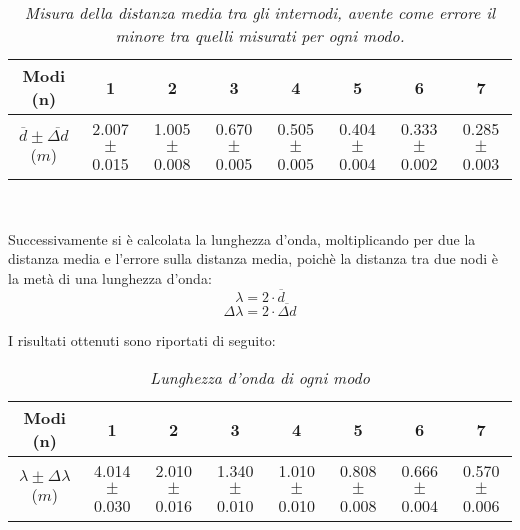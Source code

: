 \documentclass[12pt, a4paper]{article}
\begin{document}
{
\renewcommand\arraystretch{1.2} %

\begin{table}[ht] %


\begin{tabular}{|c|c|c|c|c|c|c|c|} 
 
 \hline
  \small Modi (n) & 1 & 2 & 3 & 4 & 5 & 6 & 7\\
  
\hline

  
  \small $\overline{d}\pm\overline{\Delta{d}}$ ($m$) &\footnotesize{2.007$\pm$0.015}  &\footnotesize{1.005$\pm$0.008} &\footnotesize{0.670$\pm$0.005}&\footnotesize{0.505$\pm$0.005}&\footnotesize{0.404$\pm$0.004} &\footnotesize{0.333$\pm$0.002}&\footnotesize{0.285$\pm$0.003}\\
\hline


\end{tabular}\\
\caption{\small{\textit{Misura della distanza media tra gli internodi, avente come errore il minore tra quelli misurati per ogni modo.} }}
    \label{tab:Error_MediapesataFalse}
\end{table}
}





Successivamente si è calcolata la lunghezza d'onda, moltiplicando per due la distanza media e l'errore sulla distanza media, poichè la distanza tra due nodi è la metà di una lunghezza d'onda:
\begin{equation*}
    \lambda=2\cdot\overline{d}
\end{equation*}
\begin{equation*}
    \Delta\lambda=2\cdot\overline{\Delta{d}}
\end{equation*}

\addvspace{1.5cm}
 I risultati ottenuti sono riportati di seguito:
 
 \addvspace{1cm}
 {
\renewcommand\arraystretch{1.2} %

\begin{table}[ht] %


\begin{tabular}{|c|c|c|c|c|c|c|c|} 
 
 \hline
  \small Modi (n) & 1 & 2 & 3 & 4 & 5 & 6 & 7\\
  
\hline

  
  \small $\lambda\pm\Delta\lambda$ ($m$) &\footnotesize{4.014$\pm$0.030}  &\footnotesize{2.010$\pm$0.016} &\footnotesize{1.340$\pm$0.010}&\footnotesize{1.010$\pm$0.010}&\footnotesize{0.808$\pm$0.008} &\footnotesize{0.666$\pm$0.004}&\footnotesize{0.570$\pm$0.006}\\
\hline


\end{tabular}\\
\caption{\small{\textit{Lunghezza d'onda di ogni modo} }}
    \label{tab:Lunghezza_d'onda}
\end{table}
}
\end{document}
